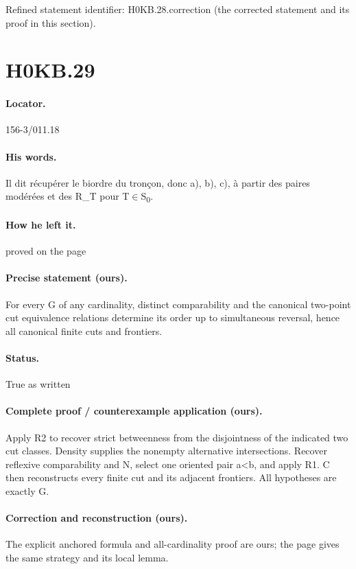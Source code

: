 \noindent Refined statement identifier: H0KB.28.correction (the corrected statement and its proof in this section).

\section*{H0KB.29}\label{statement:H0KB.29}
\paragraph{Locator.} 156-3/011.18

\paragraph{His words.} Il dit récupérer le biordre du tronçon, donc a), b), c), à partir des paires modérées et des R\_T pour T\ensuremath{\in}S\textsubscript{0}.

\paragraph{How he left it.} proved on the page

\paragraph{Precise statement (ours).} For every G of any cardinality, distinct comparability and the canonical two-point cut equivalence relations determine its order up to simultaneous reversal, hence all canonical finite cuts and frontiers.

\paragraph{Status.} True as written

\paragraph{Complete proof / counterexample application (ours).} Apply R2 to recover strict betweenness from the disjointness of the indicated two cut classes. Density supplies the nonempty alternative intersections. Recover reflexive comparability and N, select one oriented pair a<b, and apply R1. C then reconstructs every finite cut and its adjacent frontiers. All hypotheses are exactly G.

\paragraph{Correction and reconstruction (ours).} The explicit anchored formula and all-cardinality proof are ours; the page gives the same strategy and its local lemma.

